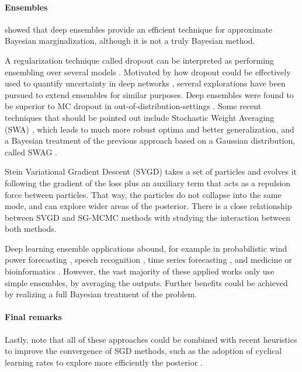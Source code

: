 \paragraph{Ensembles} \cite{bdl} showed that deep ensembles \cite{ensemble} provide an efficient technique for approximate Bayesian marginalization, although it is not a truly Bayesian method.

A regularization technique called dropout can be interpreted as performing ensembling over several models \cite{dropout}. Motivated by how dropout could be effectively used to quantify uncertainty in deep networks \cite{pmlr-v48-gal16}, several explorations have been pursued to extend ensembles for similar purposes. Deep ensembles were found to be superior to MC dropout in out-of-distribution-settings \cite{Ovadia2019CanYT}.
Some recent techniques that should be pointed out include
Stochastic Weight Averaging (SWA) \cite{izmailov2018averaging}, which leads to much more robust optima and better generalization, and a Bayesian treatment of the previous approach based on a Gaussian distribution,
called SWAG \cite{NEURIPS2019_118921ef}.

Stein Variational Gradient Descent (SVGD) \cite{svgd} takes a set of particles and evolves it following the gradient of the loss plus an auxiliary term that acts as a repulsion force between particles. That
way, the particles do not collapse into the same mode, and can explore wider areas of the posterior. There is a close relationship between SVGD and SG-MCMC methods with \cite{gallego2018stochastic} 
studying the interaction between both methods.

Deep learning ensemble applications abound, for example in probabilistic wind power forecasting \cite{wang2017deep}, speech recognition \cite{deng2014ensemble}, time series forecasting \cite{qiu2014ensemble}, and medicine or bioinformatics \cite{qummar2019deep,xiao2018deep,cao2020ensemble}. However, the vast majority of these applied works only use simple ensembles, by averaging the outputs. Further benefits could be achieved by realizing a full Bayesian treatment of the problem.


\paragraph{Final remarks}
Lastly, note that all of these approaches could be combined with recent heuristics to improve the convergence of SGD methods, such as the adoption of cyclical learning rates to explore more efficiently the posterior  \cite{7926641}.


